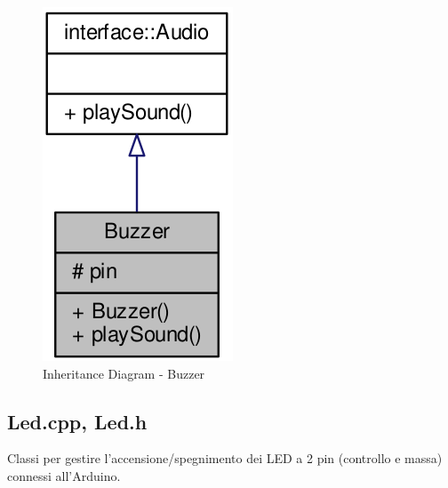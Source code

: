 \begin{figure}[!ht]
	\centering
	\includegraphics[scale=.35]{img/UML/InheritanceDiagram/Buzzer.png}
	\caption{Inheritance Diagram - Buzzer}
\end{figure}

\newpage
\subsection{Led.cpp, Led.h}
Classi per gestire l'accensione/spegnimento dei LED a 2 pin (controllo e massa) connessi all'Arduino.
